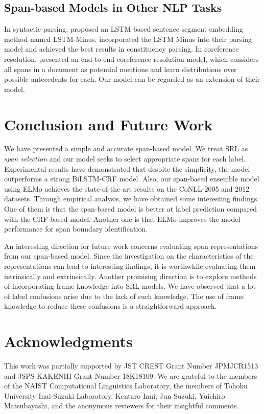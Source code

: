 \documentclass[11pt,a4paper]{article}
\begin{document}
\subsection{Span-based Models in Other NLP Tasks}
In syntactic parsing,  proposed an LSTM-based sentence segment embedding method named LSTM-Minus.
 incorporated the LSTM Minus into their parsing model and achieved the best results in constituency parsing.
In coreference resolution,  presented an end-to-end coreference resolution model, which considers all spans in a document as potential mentions and learn distributions over possible antecedents for each.
Our model can be regarded as an extension of their model.

\section{Conclusion and Future Work}
\label{sec:conc}
We have presented a simple and accurate span-based model.
We treat SRL as {\it span selection} and our model seeks to select appropriate spans for each label.
Experimental results have demonstrated that despite the simplicity, the model outperforms a strong BiLSTM-CRF model.
Also, our span-based ensemble model using ELMo achieves the state-of-the-art results on the CoNLL-2005 and 2012 datasets.
Through empirical analysis, we have obtained some interesting findings.
One of them is that the span-based model is better at label prediction compared with the CRF-based model.
Another one is that ELMo improves the model performance for span boundary identification.

An interesting direction for future work concerns evaluating span representations from our span-based model.
Since the investigation on the characteristics of the representations can lead to interesting findings, it is worthwhile evaluating them intrinsically and extrinsically.
Another promising direction is to explore methods of incorporating frame knowledge into SRL models.
We have observed that a lot of label confusions arise due to the lack of such knowledge.
The use of frame knowledge to reduce these confusions is a straightforward approach.



\section*{Acknowledgments}
This work was partially supported by JST CREST Grant Number JPMJCR1513 and JSPS KAKENHI Grant Number 18K18109.
We are grateful to the members of the NAIST Computational Linguistics Laboratory, the members of Tohoku University Inui-Suzuki Laboratory, Kentaro Inui, Jun Suzuki, Yuichiro Matsubayashi, and the anonymous reviewers for their insightful comments.
\end{document}

